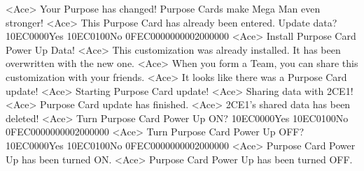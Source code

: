<Ace> Your Purpose has changed! Purpose Cards make Mega Man even stronger! 
<Ace> This Purpose Card has already been entered. Update data? 
{10}{EC}{00}{00}Yes {10}{EC}{01}{00}No {0F}{EC}{00}{00}{00}{00}{02}{00}{00}{00}
<Ace> Install Purpose Card Power Up Data! 
<Ace> This customization was already installed. 
It has been overwritten with the new one. 
<Ace> When you form a Team, you can share this customization with your friends. 
<Ace> It looks like there was a Purpose Card update! 
<Ace> Starting Purpose Card update! 
<Ace> Sharing data with {2C}{E1}! 
<Ace> Purpose Card update has finished. 
<Ace> {2C}{E1}'s shared data has been deleted! 
<Ace> Turn Purpose Card Power Up ON? {10}{EC}{00}{00}Yes {10}{EC}{01}{00}No {0F}{EC}{00}{00}{00}{00}{02}{00}{00}{00}
<Ace> Turn Purpose Card Power Up OFF? {10}{EC}{00}{00}Yes {10}{EC}{01}{00}No {0F}{EC}{00}{00}{00}{00}{02}{00}{00}{00}
<Ace> Purpose Card Power Up has been turned ON. 
<Ace> Purpose Card Power Up has been turned OFF. 
